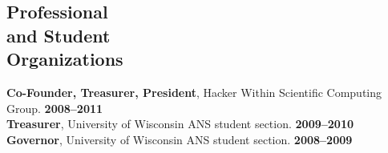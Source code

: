 \documentclass[margin,line]{resume}
\begin{document}
\begin{resume}
    \section{\mysidestyle Professional\\and Student\\Organizations} 
		\textbf{Co-Founder, Treasurer, President}, Hacker Within Scientific Computing Group. \hfill \textbf{2008--2011}\vspace{.5mm}\\%
		\textbf{Treasurer}, University of Wisconsin ANS student section. \hfill \textbf{2009--2010}\vspace{.5mm}\\%
		\textbf{Governor}, University of Wisconsin ANS student section. \hfill \textbf{2008--2009}\vspace{.5mm}\\\vspace{-2mm}%


%  
\end{resume}
\end{document}
